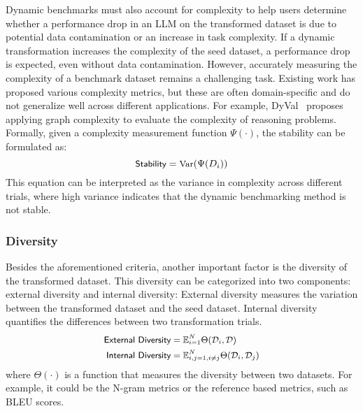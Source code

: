 Dynamic benchmarks must also account for complexity to help users determine whether a performance drop in an LLM on the transformed dataset is due to potential data contamination or an increase in task complexity. If a dynamic transformation increases the complexity of the seed dataset, a performance drop is expected, even without data contamination. However, accurately measuring the complexity of a benchmark dataset remains a challenging task. Existing work has proposed various complexity metrics, but these are often domain-specific and do not generalize well across different applications. For example, DyVal~\citep{zhu2024dyval} proposes applying graph complexity to evaluate the complexity of reasoning problems.
Formally, given a complexity measurement function \( \Psi(\cdot) \), the stability can be formulated as:  
\[
\small
    \textsf{Stability} = \text{Var}(\Psi(D_i))
\]  
This equation can be interpreted as the variance in complexity across different trials, where high variance indicates that the dynamic benchmarking method is not stable.  




\subsubsection{Diversity }
Besides the aforementioned criteria, another important factor is the diversity of the transformed dataset. This diversity can be categorized into two components: \textsf{external diversity} and \textsf{internal diversity}:  External diversity measures the variation between the transformed dataset and the seed dataset. Internal diversity quantifies the differences between two transformation trials.  
\[
    \small
    \begin{aligned}
        \textsf{External Diversity} &= \mathbb{E}_{i = 1}^{N} \Theta(\mathcal{D}_i, \mathcal{D}) \\
        \textsf{Internal Diversity} &= \mathbb{E}_{\substack{i, j = 1,  i \neq j}}^{N} \Theta(\mathcal{D}_i, \mathcal{D}_j)
    \end{aligned}
\]
where \( \Theta(\cdot) \) is a function that measures the diversity between two datasets. For example, it could be the N-gram metrics or the reference based metrics, such as BLEU scores. 





